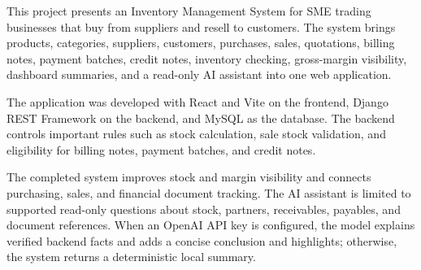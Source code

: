 This project presents an Inventory Management System for SME trading businesses that buy from suppliers and resell to customers. The system brings products, categories, suppliers, customers, purchases, sales, quotations, billing notes, payment batches, credit notes, inventory checking, gross-margin visibility, dashboard summaries, and a read-only AI assistant into one web application.

The application was developed with React and Vite on the frontend, Django REST Framework on the backend, and MySQL as the database. The backend controls important rules such as stock calculation, sale stock validation, and eligibility for billing notes, payment batches, and credit notes.

The completed system improves stock and margin visibility and connects purchasing, sales, and financial document tracking. The AI assistant is limited to supported read-only questions about stock, partners, receivables, payables, and document references. When an OpenAI API key is configured, the model explains verified backend facts and adds a concise conclusion and highlights; otherwise, the system returns a deterministic local summary.
